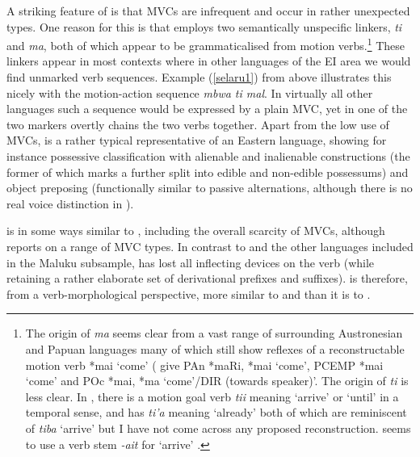 A striking feature of  is that MVCs are infrequent and occur in rather unexpected types. One reason for this is that  employs two semantically unspecific linkers, \textit{ti} and \textit{ma}, both of which appear to be grammaticalised from motion verbs.\footnote{The origin of \textit{ma} seems clear from a vast range of surrounding Austronesian and Papuan languages many of which still show reflexes of a reconstructable motion verb *mai `come' (\citealt{ross2008lexicon} give PAn *maRi, *mai `come', PCEMP *mai `come' and POc *mai, *ma `come'/DIR (towards speaker)'. The origin of \textit{ti} is less clear. In , there is a motion goal verb \textit{tii} meaning `arrive' or `until' in a temporal sense, and  has \textit{ti'a} meaning `already' both of which are reminiscent of  \textit{tiba} `arrive' but I have not come across any proposed reconstruction.  seems to use a verb stem \textit{-ait} for `arrive' \citep[175]{coward2005}.} These linkers appear in most contexts where in other languages of the EI area we would find unmarked verb sequences. Example (\ref{selaru1}) from above illustrates this nicely with the motion-action sequence \textit{mbwa ti mal}. In virtually all other languages such a sequence would be expressed by a plain MVC, yet in  one of the two markers overtly chains the two verbs together. Apart from the low use of MVCs,  is a rather typical representative of an Eastern  language, showing for instance possessive classification with alienable and inalienable constructions (the former of which marks a further split into edible and non-edible possessums) and object preposing (functionally similar to passive alternations, although there is no real voice distinction in ). 

 is in some ways similar to , including the overall scarcity of MVCs, although \citet{grimes1991buru} reports on a range of MVC types. In contrast to  and the other languages included in the Maluku subsample,  has lost all inflecting devices on the verb (while retaining a rather elaborate set of derivational prefixes and suffixes).  is therefore, from a verb-morphological perspective, more similar to  and  than it is to .

